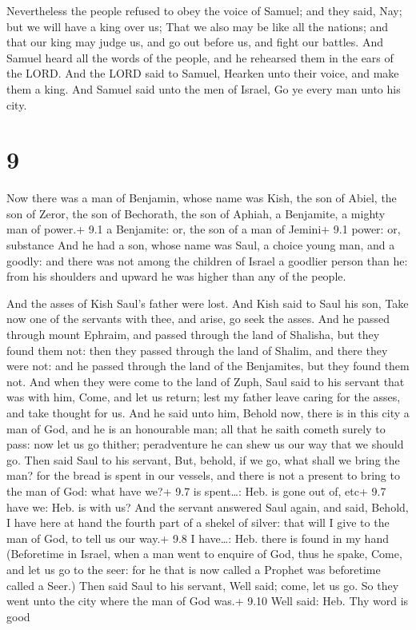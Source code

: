  Nevertheless the people refused to obey the voice of
Samuel; and they said, Nay; but we will have a king over us;
 That we also may be like all the nations; and that our
king may judge us, and go out before us, and fight our battles.
 And Samuel heard all the words of the people, and he
rehearsed them in the ears of the LORD.  And the LORD said
to Samuel, Hearken unto their voice, and make them a king. And Samuel
said unto the men of Israel, Go ye every man unto his city.

\hypertarget{section-8}{%
\section{9}\label{section-8}}

 Now there was a man of Benjamin, whose name was Kish, the
son of Abiel, the son of Zeror, the son of Bechorath, the son of Aphiah,
a Benjamite, a mighty man of power.+ 9.1 a Benjamite: or, the son of a
man of Jemini+ 9.1 power: or, substance  And he had a son,
whose name was Saul, a choice young man, and a goodly: and there was not
among the children of Israel a goodlier person than he: from his
shoulders and upward he was higher than any of the people.

 And the asses of Kish Saul's father were lost. And Kish
said to Saul his son, Take now one of the servants with thee, and arise,
go seek the asses.  And he passed through mount Ephraim, and
passed through the land of Shalisha, but they found them not: then they
passed through the land of Shalim, and there they were not: and he
passed through the land of the Benjamites, but they found them not.
 And when they were come to the land of Zuph, Saul said to
his servant that was with him, Come, and let us return; lest my father
leave caring for the asses, and take thought for us.  And he
said unto him, Behold now, there is in this city a man of God, and he is
an honourable man; all that he saith cometh surely to pass: now let us
go thither; peradventure he can shew us our way that we should go.
 Then said Saul to his servant, But, behold, if we go, what
shall we bring the man? for the bread is spent in our vessels, and there
is not a present to bring to the man of God: what have we?+ 9.7 is
spent\ldots: Heb. is gone out of, etc+ 9.7 have we: Heb. is with us?
 And the servant answered Saul again, and said, Behold, I
have here at hand the fourth part of a shekel of silver: that will I
give to the man of God, to tell us our way.+ 9.8 I have\ldots: Heb.
there is found in my hand  (Beforetime in Israel, when a man
went to enquire of God, thus he spake, Come, and let us go to the seer:
for he that is now called a Prophet was beforetime called a Seer.)
 Then said Saul to his servant, Well said; come, let us go.
So they went unto the city where the man of God was.+ 9.10 Well said:
Heb. Thy word is good

